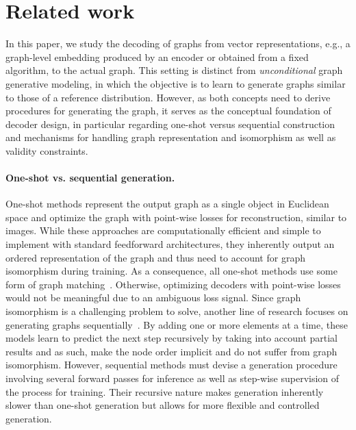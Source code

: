 \section{Related work}\label{sec:related-work}
In this paper, we study the decoding of graphs from vector representations, e.g., a graph-level embedding produced
by an encoder or obtained from a fixed algorithm, to the actual graph.
This setting is distinct from \emph{unconditional} graph generative modeling, in which the objective is to learn to generate
graphs similar to those of a reference distribution.
However, as both concepts need to derive procedures for generating the graph, it serves as the conceptual foundation of decoder
design, in particular regarding one-shot versus sequential construction and mechanisms for handling graph representation and isomorphism
as well as validity constraints.

\paragraph{One-shot vs. sequential generation.}
One-shot methods represent the output graph as a single object in Euclidean space and optimize the graph with point-wise losses
for reconstruction, similar to images.
While these approaches are computationally efficient and simple to implement with standard feedforward architectures,
they inherently output an ordered representation of the graph and thus need to account for graph isomorphism during training.
As a consequence, all one-shot methods use some form of graph matching~\cite{graphvae,winter2021pigvae,any2graph2024,grale2025}.
Otherwise, optimizing decoders with point-wise losses would not be meaningful due to an ambiguous loss signal.
Since graph isomorphism is a challenging problem to solve, another line of research focuses on generating graphs
sequentially~\cite{graphrnn,gran,learning-deep-gen-graphs,grover2019graphite,gcpn}.
By adding one or more elements at a time, these models learn to predict the next step recursively by taking into account
partial results and as such, make the node order implicit and do not suffer from graph isomorphism.
However, sequential methods must devise a generation procedure involving several forward passes for inference as well as step-wise supervision
of the process for training.
Their recursive nature makes generation inherently slower than one-shot generation but allows for more flexible and controlled generation.

